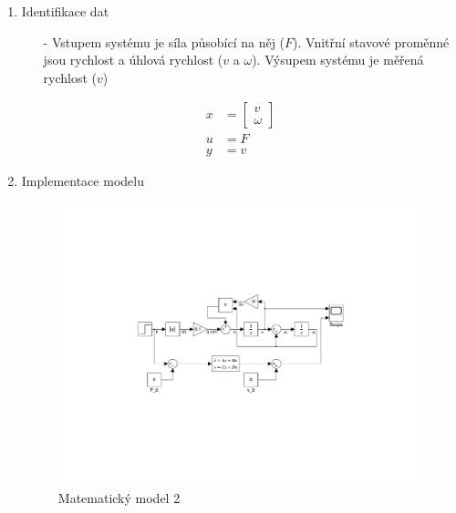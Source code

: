 \documentclass{article}
\newcommand\mat[1]{\begin{bmatrix}#1\end{bmatrix}}
\begin{document}
\begin{enumerate}
    
    \item Identifikace dat
        \begin{itemize}
            \item[-] Vstupem systému je síla působící na něj ($F$). Vnitřní stavové proměnné jsou rychlost a úhlová rychlost ($v$ a $\omega$). Výsupem systému je měřená rychlost ($v$)
        \end{itemize}
        \begin{align*}
            x &= \mat{v\\ \omega}\\
            u &= F\\
            y &= v
        \end{align*}
    
    \item Implementace modelu
        \begin{figure}[H]
        \centering
        \includegraphics[clip,trim=6cm 7cm 6.1cm 7cm, width=1.00\textwidth]{Figures/ARI_HW1_Circuit_2.pdf}
        \caption{Matematický model 2}
        \label{fig:Model_1}
    \end{figure}


    \newpage
    

\end{enumerate}
\end{document}
